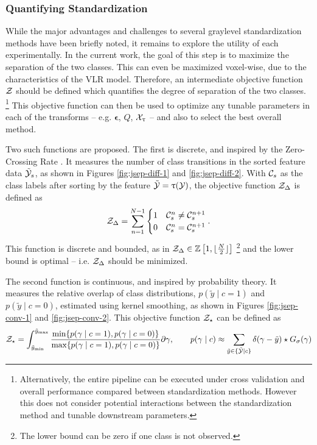 \subsubsection{Quantifying Standardization}
While the major advantages and challenges to several graylevel standardization methods have been briefly noted, it remains to explore the utility of each experimentally.
In the current work, the goal of this step is to maximize the separation of the two classes.
This can even be maximized voxel-wise, due to the characteristics of the VLR model.
Therefore, an intermediate objective function $\mathcal{Z}$ should be defined which quantifies the degree of separation of the two classes.%
\footnote{Alternatively, the entire pipeline can be executed under cross validation and overall performance compared between standardization methods.
However this does not consider potential interactions between the standardization method and tunable downstream parameters.}
This objective function can then be used to optimize any tunable parameters in each of the transforms -- e.g. $\bm{\epsilon}$, $Q$, $\mathcal{X}_{\uptau}$ -- and also to select the best overall method.
\par
Two such functions are proposed.
The first is discrete, and inspired by the Zero-Crossing Rate \cite{Kedem1986}.
It measures the number of class transitions in the sorted feature data $\tilde{\mathcal{Y}}_s$, as shown in Figures \ref{fig:jsep-diff-1} and \ref{fig:jsep-diff-2}.
With $\mathcal{C}_s$ as the class labels after sorting by the feature $\tilde{\mathcal{Y}} = \uptau(\mathcal{Y})$, the objective function $\mathcal{Z}_{\Delta}$ is defined as
\begin{equation}
\mathcal{Z}_{\Delta} = \sum_{n=1}^{N-1}\begin{cases}
1&\mathcal{C}_s^{n} \ne \mathcal{C}_s^{n+1}\\
0&\mathcal{C}_s^{n}  =  \mathcal{C}_s^{n+1}
\end{cases}.
\end{equation}
This function is discrete and bounded, as in $\mathcal{Z}_{\Delta}\in\mathbb{Z}\left[1,\lfloor\frac{N}{2}\rfloor\right]$%
\footnote{The lower bound can be zero if one class is not observed.}
and the lower bound is optimal -- i.e. $\mathcal{Z}_{\Delta}$ should be minimized.
\par
The second function is continuous, and inspired by probability theory.
It measures the relative overlap of class distributions, $p(\tilde{y}\mid c=1)$ and $p(\tilde{y}\mid c=0)$, estimated using kernel smoothing, as shown in Figures \ref{fig:jsep-conv-1} and \ref{fig:jsep-conv-2}.
This objective function $\mathcal{Z}_{\star}$ can be defined as
\begin{equation}
\mathcal{Z}_{\star} = \int_{\tilde{y}_{\min}}^{\tilde{y}_{\max}}
\frac{\min\{p(\gamma \mid c=1), p(\gamma \mid c=0)\}}
     {\max\{p(\gamma \mid c=1), p(\gamma \mid c=0)\}}\partial\gamma,
\qquad p(\gamma \mid c) \approx \sum_{\tilde{y}\in\{\tilde{\mathcal{Y}}\mid c\}}\delta(\gamma-\tilde{y}) \star G_{\sigma}(\gamma)
\end{equation}
